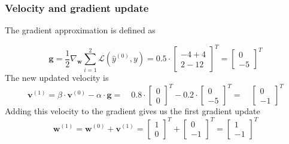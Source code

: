 \documentclass[addpoints]{exam}
\begin{document}
    \subsubsection{Velocity and gradient update}
 The gradient approximation is defined as
    
    	\begin{equation}
    		\textbf{g} = \frac{1}{2} \nabla_{\textbf{w}}{\sum_{i = 1}^{2}\mathscr{L}(\hat{{y}}^{(0)},y)} = 0.5 \cdot\begin{bmatrix}
    			-4 +4 \\2-12
    			
    		\end{bmatrix}^{T} = \begin{bmatrix}
    		0 \\-5
    		
    	\end{bmatrix}^{T}
    	\end{equation}
    The new updated velocity is 
    \begin{equation}
    	\textbf{v}^{(1)} = \beta \cdot \textbf{v}^{(0)} - \alpha \cdot \textbf{g} = \quad  0.8\cdot \begin{bmatrix}
    		0 \\0
    		
    	\end{bmatrix}^{T}- 0.2 \cdot \begin{bmatrix}
    		0 \\-5
    		
    	\end{bmatrix}^{T} = \quad  \begin{bmatrix}
    	0 \\-1
    	
    \end{bmatrix}^{T}
    \end{equation}
Adding this velocity to the gradient gives us the first gradient update
\begin{equation}
	\textbf{w}^{(1)} = \textbf{w}^{(0)} + \textbf{v}^{(1)} = \begin{bmatrix}
		1 \\0
		
	\end{bmatrix}^{T} +  \begin{bmatrix}
	0 \\-1
	
\end{bmatrix}^{T} =  \begin{bmatrix}
1 \\-1

\end{bmatrix}^{T}
\end{equation}
\end{document}
